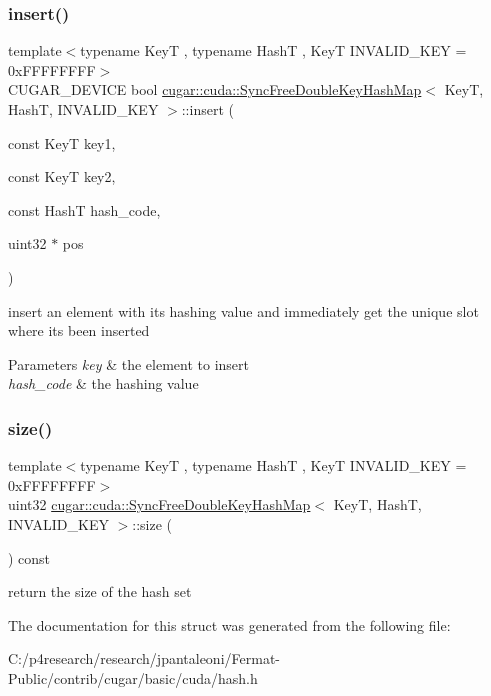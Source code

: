 \subsubsection{\texorpdfstring{insert()}{insert()}\hspace{0.1cm}{\footnotesize\ttfamily [2/2]}}
{\footnotesize\ttfamily template$<$typename KeyT , typename HashT , KeyT I\+N\+V\+A\+L\+I\+D\+\_\+\+K\+EY = 0x\+F\+F\+F\+F\+F\+F\+FF$>$ \\
C\+U\+G\+A\+R\+\_\+\+D\+E\+V\+I\+CE bool \hyperlink{structcugar_1_1cuda_1_1_sync_free_double_key_hash_map}{cugar\+::cuda\+::\+Sync\+Free\+Double\+Key\+Hash\+Map}$<$ KeyT, HashT, I\+N\+V\+A\+L\+I\+D\+\_\+\+K\+EY $>$\+::insert (\begin{DoxyParamCaption}\item[{const KeyT}]{key1,  }\item[{const KeyT}]{key2,  }\item[{const HashT}]{hash\+\_\+code,  }\item[{uint32 $\ast$}]{pos }\end{DoxyParamCaption})\hspace{0.3cm}{\ttfamily [inline]}}

insert an element with its hashing value and immediately get the unique slot where it\textquotesingle{}s been inserted


\begin{DoxyParams}{Parameters}
{\em key} & the element to insert \\
\hline
{\em hash\+\_\+code} & the hashing value \\
\hline
\end{DoxyParams}
\mbox{\label{structcugar_1_1cuda_1_1_sync_free_double_key_hash_map_af48b50f724ede760119178bf1020ecea}} 
\subsubsection{\texorpdfstring{size()}{size()}}
{\footnotesize\ttfamily template$<$typename KeyT , typename HashT , KeyT I\+N\+V\+A\+L\+I\+D\+\_\+\+K\+EY = 0x\+F\+F\+F\+F\+F\+F\+FF$>$ \\
uint32 \hyperlink{structcugar_1_1cuda_1_1_sync_free_double_key_hash_map}{cugar\+::cuda\+::\+Sync\+Free\+Double\+Key\+Hash\+Map}$<$ KeyT, HashT, I\+N\+V\+A\+L\+I\+D\+\_\+\+K\+EY $>$\+::size (\begin{DoxyParamCaption}{ }\end{DoxyParamCaption}) const\hspace{0.3cm}{\ttfamily [inline]}}

return the size of the hash set 

The documentation for this struct was generated from the following file\+:\begin{DoxyCompactItemize}
\item 
C\+:/p4research/research/jpantaleoni/\+Fermat-\/\+Public/contrib/cugar/basic/cuda/hash.\+h\end{DoxyCompactItemize}
